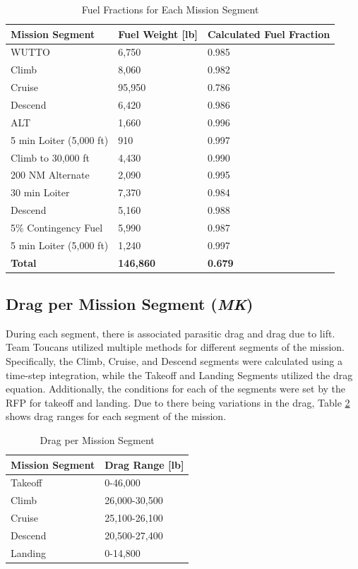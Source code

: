 \begin{table}[!h]
    \centering
    \caption{Fuel Fractions for Each Mission Segment}
    \begin{tabular}{|p{1.75in}|p{1in}|p{1.5in}|}\toprule 
    \textbf{Mission Segment} & \textbf{Fuel Weight [lb]} & \textbf{Calculated Fuel Fraction}\\ \hline \hline
    WUTTO & 6,750 & 0.985 \\ \hline
    Climb & 8,060 & 0.982  \\ \hline
    Cruise & 95,950 & 0.786 \\ \hline
    Descend & 6,420 & 0.986 \\ \hline
    ALT & 1,660 & 0.996 \\ \hline
    5 min Loiter (5,000 ft) & 910 & 0.997 \\ \hline
    Climb to 30,000 ft & 4,430 & 0.990 \\
    \hline
    200 NM Alternate & 2,090 & 0.995 \\ \hline
    30 min Loiter & 7,370 & 0.984 \\ \hline
    Descend & 5,160 & 0.988 \\ \hline
    5\% Contingency Fuel & 5,990 & 0.987 \\ \hline
    5 min Loiter (5,000 ft) & 1,240 & 0.997 \\ \hline
    \textbf{Total} & \textbf{146,860} & \textbf{0.679} \\
    \bottomrule
    \end{tabular}
    \label{fuelfrac}
\end{table}

\subsection{Drag per Mission Segment (\textit{MK})}
During each segment, there is associated parasitic drag and drag due to lift. Team Toucans utilized multiple methods for different segments of the mission. Specifically, the Climb, Cruise, and Descend segments were calculated using a time-step integration, while the Takeoff and Landing Segments utilized the drag equation. Additionally, the conditions for each of the segments were set by the RFP for takeoff and landing. Due to there being variations in the drag, Table \ref{dragseg} shows drag ranges for each segment of the mission. 

\begin{table}[h]
    \centering
    \caption{Drag per Mission Segment}
    \begin{tabular}{|p{1.5in}|p{1in}|}\toprule 
    \textbf{Mission Segment} & \textbf{Drag Range [lb]} \\ \hline \hline
    Takeoff & 0-46,000 \\ \hline
    Climb & 26,000-30,500   \\ \hline
    Cruise & 25,100-26,100 \\ \hline
    Descend & 20,500-27,400 \\ \hline
    Landing & 0-14,800 \\
    \bottomrule
    \end{tabular}
    \label{dragseg}
\end{table}

